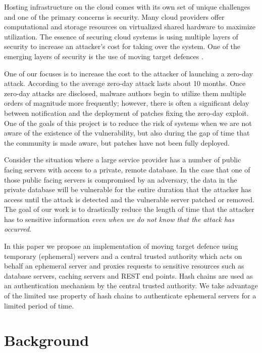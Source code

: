 \documentclass[a4paper,twoside]{article}
\begin{document}
Hosting infrastructure on the cloud comes with its own set of unique challenges and one of the primary concerns is security. Many cloud providers offer computational and storage resources on virtualized shared hardware to maximize utilization. The essence of securing cloud systems is using multiple layers \cite{panwar_layered_2011} of security to increase an attacker's cost for taking over the system. One of the emerging layers of security is the use of moving target defences \cite{evans_effectiveness_2011}.  

One of our focuses is to increase the cost to the attacker of launching a zero-day attack. According to \cite{bilge_before_2012} the average zero-day attack lasts about 10 months. Once zero-day attacks are disclosed, malware authors begin to utilize them multiple orders of magnitude more frequently; however, there is often a significant delay between notification and the deployment of patches fixing the zero-day exploit. One of the goals of this project is to reduce the risk of systems when we are not aware of the existence of the vulnerability, but also during the gap of time that the community is made aware, but patches have not been fully deployed.

Consider the situation where a large service provider has a number of public facing servers with access to a private, remote database.  In the case that one of those public facing servers is compromised by an adversary, the data in the private database will be vulnerable for the entire duration that the attacker has access until the attack is detected and the vulnerable server patched or removed.  The goal of our work is to drastically reduce the length of time that the attacker has to sensitive information \textit{even when we do not know that the attack has occurred}. 

In this paper we propose an implementation of moving target defence using temporary (ephemeral) servers and a central trusted authority which acts on behalf an ephemeral server and proxies requests to sensitive resources such as database servers, caching servers and REST end points. Hash chains are used as an authentication mechanism by the central trusted authority. We take advantage of the limited use property of hash chains to authenticate ephemeral servers for a limited period of time.

\section{Background}
\end{document}

